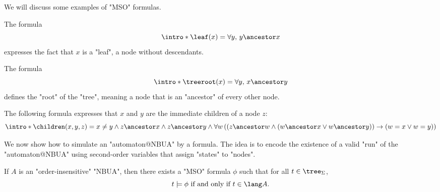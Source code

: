 \documentclass[a4paper,UKenglish,cleveref, autoref, thm-restate]{lipics-v2021}
\begin{document}
We will discuss some examples of "MSO" formulas.

\begin{example}
	\AP The formula
	\[
		\intro* \leaf(x) = \forall y,\, y \ancestor x
	\]
	expresses the fact that $x$ is a "leaf", a node without descendants.
\end{example}

\begin{example}
	\AP The formula
	\[
		\intro* \treeroot(x) = \forall y,\, x \ancestor y
	\]
	defines the "root" of the "tree", meaning a node that is an "ancestor" of every other node.
\end{example}

\begin{example}
	\AP The following formula expresses that $x$ and $y$ are the immediate children of a node $z$:
	\[
		\intro* \children(x,y,z) =
		x \neq y \land
		z \ancestor x \land  z \ancestor y \land
		\forall w
		\left( \left(
			z \ancestor w \land
				(w \ancestor x \lor w \ancestor  y) \right) \rightarrow (
			w = x \lor w = y
			)
		\right)
	\]
\end{example}

We now show how to simulate an "automaton@NBUA" by a formula. The idea is to encode the existence of a valid "run" of
the "automaton@NBUA" using second-order variables that assign "states" to "nodes".

\begin{lemma}
	If $A$ is an "order-insensitive" "NBUA", then there exists a "MSO" formula $\phi$ such that for all $t \in \tree_{\Sigma}$,
	\[
		t \models \phi \tiff t \in \lang A.
	\]
\end{lemma}
\end{document}
